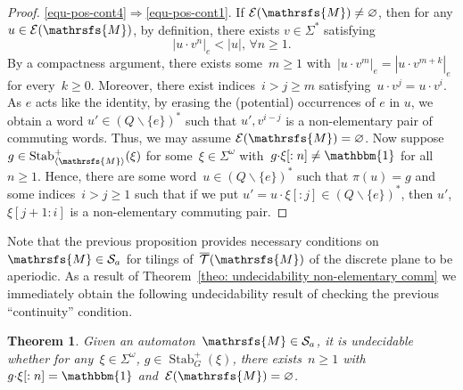 \documentclass{amsart}
\newtheorem{theorem}{Theorem}[section]
\begin{document}
{\begin{proof}
\ref{equ-pos-cont4}$\Rightarrow$\ref{equ-pos-cont1}. If $\mathcal{E}({{{\mathrsfs{{M}}}}})\neq\varnothing$, then for any $u\in\mathcal{E}({{{\mathrsfs{{M}}}}})$, by definition, there exists $v\in {{{\Sigma}}}^{*}$ satisfying
\[|u{{{\cdot}}} v^{n}|_{e}<|u|, \,\forall n\ge 1.\]
By a compactness argument, there exists some~$m\ge 1$ with~$|u{{{\cdot}}} v^{m}|_{e}=|u{{{\cdot}}} v^{m+k}|_{e}$ for every~$k\ge 0$. Moreover, there exist indices~$i>j\ge m$ satisfying~$u{{{\cdot}}} v^{j}=u{{{\cdot}}} v^{i}$. As $e$ acts like the identity, by erasing the (potential) occurrences of $e$ in $u$, we obtain a word  $u'\in ({{{Q}}}\smallsetminus\{e\})^{*}$ such that $u', v^{i-j}$ is a non-elementary pair of commuting words. Thus, we may assume $\mathcal{E}({{{\mathrsfs{{M}}}}})=\varnothing$. Now suppose~$g\in\operatorname{Stab}^{+}_{{{\langle}{{\mathrsfs{{{M}}}}}{\rangle}}}(\xi)$ for some~$\xi\in {{{\Sigma}}}^{\omega}$ with~$g{{{\cdot}}} \xi[:n]\neq \operatorname{\mathbbm{1}}$ for all~$n\ge 1$. Hence, there are some word~$u\in ({{{Q}}}\smallsetminus\{e\})^{*}$ such that $\pi(u)=g$ and some indices~$i> j\ge 1$ such that if we put
$u'=u{{{\cdot}}} \xi[:j]\in ({{{Q}}}\smallsetminus\{e\})^{*}$, then $u'$, $\xi[j+1:i]$ is a non-elementary commuting pair.
\end{proof}

Note that the previous proposition provides necessary conditions on~${{{\mathrsfs{{M}}}}}\in{\hbox{${\mathcal S}_{a}$}}$ for tilings of~$\overline{\mathcal{T}}({{{\mathrsfs{{M}}}}})$ of the discrete plane to be aperiodic. As a result of Theorem~\ref{theo: undecidability non-elementary comm} we immediately obtain the following undecidability result of checking the previous ``continuity'' condition.

\begin{theorem}
Given an automaton~${{{\mathrsfs{{M}}}}}\in{\hbox{${\mathcal S}_{a}$}}$, it is undecidable whether for any~$\xi\in {{{\Sigma}}}^{\omega}$, $g\in\operatorname{Stab}^{+}_{G}(\xi)$, there exists~$n\ge 1$ with~$g{{{\cdot}}} \xi[:n]=\operatorname{\mathbbm{1}}$ and~$\mathcal{E}({{{\mathrsfs{{M}}}}})=\varnothing$.
\end{theorem}

}
\end{document}
